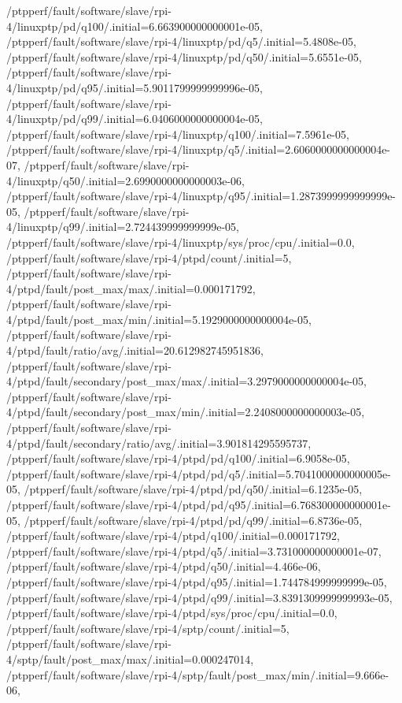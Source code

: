 {    /ptpperf/fault/software/slave/rpi-4/linuxptp/pd/q100/.initial=6.663900000000001e-05,
    /ptpperf/fault/software/slave/rpi-4/linuxptp/pd/q5/.initial=5.4808e-05,
    /ptpperf/fault/software/slave/rpi-4/linuxptp/pd/q50/.initial=5.6551e-05,
    /ptpperf/fault/software/slave/rpi-4/linuxptp/pd/q95/.initial=5.9011799999999996e-05,
    /ptpperf/fault/software/slave/rpi-4/linuxptp/pd/q99/.initial=6.0406000000000004e-05,
    /ptpperf/fault/software/slave/rpi-4/linuxptp/q100/.initial=7.5961e-05,
    /ptpperf/fault/software/slave/rpi-4/linuxptp/q5/.initial=2.6060000000000004e-07,
    /ptpperf/fault/software/slave/rpi-4/linuxptp/q50/.initial=2.6990000000000003e-06,
    /ptpperf/fault/software/slave/rpi-4/linuxptp/q95/.initial=1.2873999999999999e-05,
    /ptpperf/fault/software/slave/rpi-4/linuxptp/q99/.initial=2.724439999999999e-05,
    /ptpperf/fault/software/slave/rpi-4/linuxptp/sys/proc/cpu/.initial=0.0,
    /ptpperf/fault/software/slave/rpi-4/ptpd/count/.initial=5,
    /ptpperf/fault/software/slave/rpi-4/ptpd/fault/post_max/max/.initial=0.000171792,
    /ptpperf/fault/software/slave/rpi-4/ptpd/fault/post_max/min/.initial=5.1929000000000004e-05,
    /ptpperf/fault/software/slave/rpi-4/ptpd/fault/ratio/avg/.initial=20.612982745951836,
    /ptpperf/fault/software/slave/rpi-4/ptpd/fault/secondary/post_max/max/.initial=3.2979000000000004e-05,
    /ptpperf/fault/software/slave/rpi-4/ptpd/fault/secondary/post_max/min/.initial=2.2408000000000003e-05,
    /ptpperf/fault/software/slave/rpi-4/ptpd/fault/secondary/ratio/avg/.initial=3.901814295595737,
    /ptpperf/fault/software/slave/rpi-4/ptpd/pd/q100/.initial=6.9058e-05,
    /ptpperf/fault/software/slave/rpi-4/ptpd/pd/q5/.initial=5.7041000000000005e-05,
    /ptpperf/fault/software/slave/rpi-4/ptpd/pd/q50/.initial=6.1235e-05,
    /ptpperf/fault/software/slave/rpi-4/ptpd/pd/q95/.initial=6.768300000000001e-05,
    /ptpperf/fault/software/slave/rpi-4/ptpd/pd/q99/.initial=6.8736e-05,
    /ptpperf/fault/software/slave/rpi-4/ptpd/q100/.initial=0.000171792,
    /ptpperf/fault/software/slave/rpi-4/ptpd/q5/.initial=3.731000000000001e-07,
    /ptpperf/fault/software/slave/rpi-4/ptpd/q50/.initial=4.466e-06,
    /ptpperf/fault/software/slave/rpi-4/ptpd/q95/.initial=1.744784999999999e-05,
    /ptpperf/fault/software/slave/rpi-4/ptpd/q99/.initial=3.8391309999999993e-05,
    /ptpperf/fault/software/slave/rpi-4/ptpd/sys/proc/cpu/.initial=0.0,
    /ptpperf/fault/software/slave/rpi-4/sptp/count/.initial=5,
    /ptpperf/fault/software/slave/rpi-4/sptp/fault/post_max/max/.initial=0.000247014,
    /ptpperf/fault/software/slave/rpi-4/sptp/fault/post_max/min/.initial=9.666e-06,
}
